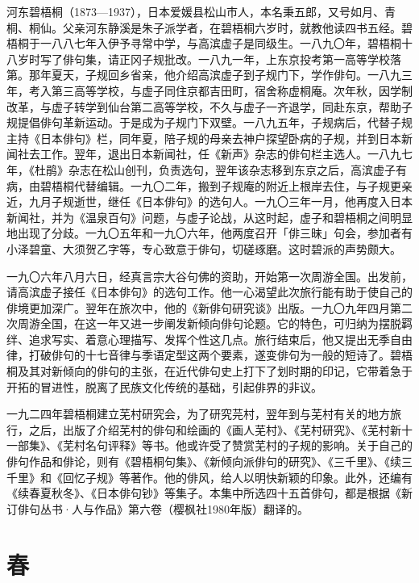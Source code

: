 {\FS
    河东碧梧桐（1873—1937），日本爱媛县松山市人，本名秉五郎，又号如月、青桐、桐仙。父亲河东静溪是朱子派学者，在碧梧桐六岁时，就教他读四书五经。碧梧桐于一八八七年入伊予寻常中学，与高滨虚子是同级生。一八九〇年，碧梧桐十八岁时写了俳句集，请正冈子规批改。一八九一年，上东京投考第一高等学校落第。那年夏天，子规回乡省亲，他介绍高滨虚子到子规门下，学作俳句。一八九三年，考入第三高等学校，与虚子同住京都吉田町，宿舍称虚桐庵。次年秋，因学制改革，与虚子转学到仙台第二高等学校，不久与虚子一齐退学，同赴东京，帮助子规提倡俳句革新运动。于是成为子规门下双壁。一八九五年，子规病后，代替子规主持《日本俳句》栏，同年夏，陪子规的母亲去神户探望卧病的子规，并到日本新闻社去工作。翌年，退出日本新闻社，任《新声》杂志的俳句栏主选人。一八九七年，《杜鹃》杂志在松山创刊，负责选句，翌年该杂志移到东京之后，高滨虚子有病，由碧梧桐代替编辑。一九〇二年，搬到子规庵的附近上根岸去住，与子规更亲近，九月子规逝世，继任《日本俳句》的选句人。一九〇三年一月，他再度入日本新闻社，并为《温泉百句》问题，与虚子论战，从这时起，虚子和碧梧桐之间明显地出现了分歧。一九〇五年和一九〇六年，他两度召开「俳三昧」句会，参加者有小泽碧童、大须贺乙字等，专心致意于俳句，切磋琢磨。这时碧派的声势颇大。

    一九〇六年八月六日，经真言宗大谷句佛的资助，开始第一次周游全国。出发前，请高滨虚子接任《日本俳句》的选句工作。他一心渴望此次旅行能有助于使自己的俳境更加深广。翌年在旅次中，他的《新俳句研究谈》出版。一九〇九年四月第二次周游全国，在这一年又进一步阐发新倾向俳句论题。它的特色，可归纳为摆脱羁绊、追求写实、着意心理描写、发挥个性这几点。旅行结束后，他又提出无季自由律，打破俳句的十七音律与季语定型这两个要素，遂变俳句为一般的短诗了。碧梧桐及其对新倾向的俳句的主张，在近代俳句史上打下了划时期的印记，它带着急于开拓的冒进性，脱离了民族文化传统的基础，引起俳界的非议。

    一九二四年碧梧桐建立芜村研究会，为了研究芫村，翌年到与芜村有关的地方旅行，之后，出版了介绍芜村的俳句和绘画的《画人芜村》、《芜村研究》、《芜村新十一部集》、《芜村名句评释》等书。他或许受了赞赏芜村的子规的影响。关于自己的俳句作品和俳论，则有《碧梧桐句集》、《新倾向派俳句的研究》、《三千里》、《续三千里》和《回忆子规》等著作。他的俳风，给人以明快新颖的印象。此外，还编有《续春夏秋冬》、《日本俳句钞》等集子。本集中所选四十五首俳句，都是根据《新订俳句丛书·人与作品》第六卷（樱枫社1980年版）翻译的。
}

\newpage

\section{\FK 春}

